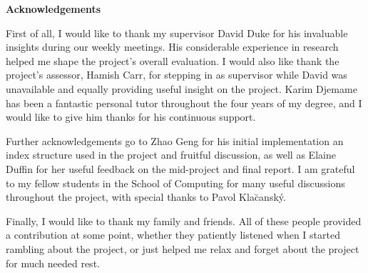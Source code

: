 \begin{center}
    {\LARGE\bf Acknowledgements}
\end{center}

First of all, I would like to thank my supervisor David Duke for his invaluable insights during our weekly meetings. His considerable experience in research helped me shape the project's overall evaluation. I would also like thank the project's assessor, Hamish Carr, for stepping in as supervisor while David was unavailable and equally providing useful insight on the project. Karim Djemame has been a fantastic personal tutor throughout the four years of my degree, and I would like to give him thanks for his continuous support.

Further acknowledgements go to Zhao Geng for his initial implementation an index structure used in the project and fruitful discussion, as well as Elaine Duffin for her useful feedback on the mid-project and final report. I am grateful to my fellow students in the School of Computing for many useful discussions throughout the project, with special thanks to Pavol Kla\u{c}ansk\'{y}.

Finally, I would like to thank my family and friends. All of these people provided a contribution at some point, whether they patiently listened when I started rambling about the project, or just helped me relax and forget about the project for much needed rest.